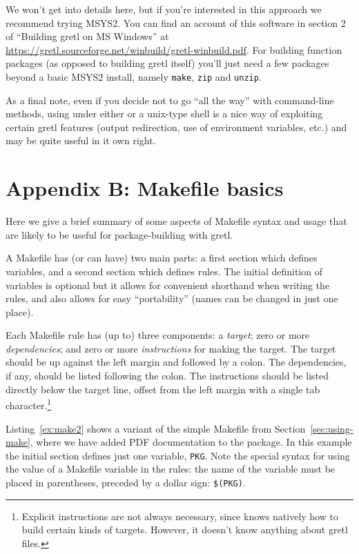 \documentclass[oneside]{book}
\begin{document}
We won't get into details here, but if you're interested in this
approach we recommend trying \textsf{MSYS2}. You can find an account
of this software in section 2 of ``Building gretl on MS Windows'' at
\url{https://gretl.sourceforge.net/winbuild/gretl-winbuild.pdf}.  For
building function packages (as opposed to building gretl itself)
you'll just need a few packages beyond a basic \textsf{MSYS2} install,
namely \texttt{make}, \texttt{zip} and \texttt{unzip}.

As a final note, even if you decide not to go ``all the way'' with
command-line methods, using  under either 
or a unix-type shell is a nice way of exploiting certain gretl
features (output redirection, use of environment variables, etc.) and
may be quite useful in it own right.


\section*{Appendix B: Makefile basics}

Here we give a brief summary of some aspects of Makefile syntax and
usage that are likely to be useful for package-building with gretl.

A Makefile has (or can have) two main parts: a first section which
defines variables, and a second section which defines rules. The
initial definition of variables is optional but it allows for
convenient shorthand when writing the rules, and also allows for easy
``portability'' (names can be changed in just one place).

Each Makefile rule has (up to) three components: a \textit{target};
zero or more \textit{dependencies}; and zero or more
\textit{instructions} for making the target. The target should be up
against the left margin and followed by a colon. The dependencies, if
any, should be listed following the colon. The instructions should be
listed directly below the target line, offset from the left margin
with a single tab character.\footnote{Explicit instructions are not
  always necessary, since  knows natively how to build
  certain kinds of targets. However, it doesn't know anything about
  gretl files.}

Listing~\ref{ex:make2} shows a variant of the simple Makefile from
Section~\ref{sec:using-make}, where we have added PDF documentation to
the package. In this example the initial section defines just one
variable, \texttt{PKG}. Note the special syntax for using the value of
a Makefile variable in the rules: the name of the variable must be
placed in parentheses, preceded by a dollar sign: \texttt{\$(PKG)}.
\end{document}
